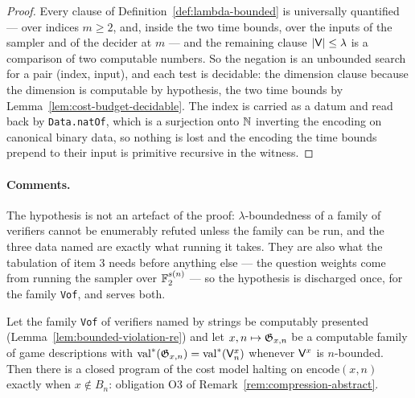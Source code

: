 \begin{proof}
\leanok
{}
Every clause of Definition~\ref{def:lambda-bounded} is universally quantified --- over
indices $m \geq 2$, and, inside the two time bounds, over the inputs of the sampler and of
the decider at $m$ --- and the remaining clause $\left\vert {\mathsf{V}} \right\vert \leq \lambda$ is a
comparison of two computable numbers. So the negation is an unbounded search for a pair
(index, input), and each test is decidable: the dimension clause because the dimension is
computable by hypothesis, the two time bounds by
Lemma~\ref{lem:cost-budget-decidable}. The index is carried as a datum and read back by
\texttt{Data.natOf}, which is a surjection onto $\mathbb{N}$ inverting the encoding on canonical
binary data, so nothing is lost and the encoding the time bounds prepend to their input is
primitive recursive in the witness.
\end{proof}

\paragraph{Comments.} The hypothesis is not an artefact of the proof: $\lambda$-boundedness
of a family of verifiers cannot be enumerably refuted unless the family can be run, and the
three data named are exactly what running it takes. They are also what the tabulation of
item 3 needs before anything else --- the question weights come from running the sampler over
$\mathbb{F}_2^{s(n)}$ --- so the hypothesis is discharged once, for the family \texttt{Vof}, and
serves both.

\effortMedium

\begin{lemma}
\label{lem:halting-semidecider}
\leanok
Let the family \texttt{Vof} of verifiers named by strings be computably presented
(Lemma~\ref{lem:bounded-violation-re}) and let $x, n \mapsto \mathfrak{G}_{x,n}$ be a computable
family of game descriptions with $\mathrm{val}^*(\mathfrak{G}_{x, n}) = \mathrm{val}^*(\mathsf{V}^x_n)$
whenever $\mathsf{V}^x$ is $n$-bounded. Then there is a closed program of the cost model
halting on $\mathrm{encode}(x, n)$ exactly when $x \notin B_n$: obligation O3 of
Remark~\ref{rem:compression-abstract}.
\end{lemma}

